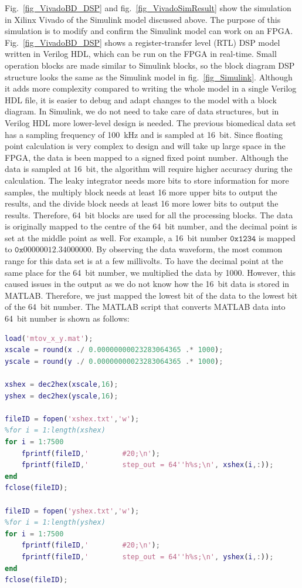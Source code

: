 Fig.~\ref{fig_VivadoBD_DSP} and fig.~\ref{fig_VivadoSimResult} show the simulation in Xilinx Vivado of the Simulink model discussed above.  The purpose of this simulation is to modify and confirm the Simulink model can work on an FPGA.  Fig.~\ref{fig_VivadoBD_DSP} shows a register-transfer level (RTL) DSP model written in Verilog HDL, which can be run on the FPGA in real-time.  Small operation blocks are made similar to Simulink blocks, so the block diagram DSP structure looks the same as the Simulink model in fig.~\ref{fig_Simulink}.  Although it adds more complexity compared to writing the whole model in a single Verilog HDL file, it is easier to debug and adapt changes to the model with a block diagram.  In Simulink, we do not need to take care of data structures, but in Verilog HDL more lower-level design is needed.  The previous biomedical data set has a sampling frequency of \qty{100}{kHz} and is sampled at \qty{16}{bit}.  Since floating point calculation is very complex to design and will take up large space in the FPGA, the data is been mapped to a signed fixed point number.   Although the data is sampled at \qty{16}{bit}, the algorithm will require higher accuracy during the calculation.  The leaky integrator needs more bits to store information for more samples, the multiply block needs at least 16 more upper bits to output the results, and the divide block needs at least 16 more lower bits to output the results.  Therefore, \qty{64}{bit} blocks are used for all the processing blocks.  The data is originally mapped to the centre of the \qty{64}{bit} number, and the decimal point is set at the middle point as well.  For example, a \qty{16}{bit} number $\mathtt{0x1234}$ is mapped to $\mathtt{0x00000012.34000000}$.  By observing the data waveform, the most common range for this data set is at a few millivolts.  To have the decimal point at the same place for the \qty{64}{bit} number, we multiplied the data by 1000.  However, this caused issues in the output as we do not know how the \qty{16}{bit} data is stored in MATLAB.  Therefore, we just mapped the lowest bit of the data to the lowest bit of the \qty{64}{bit} number.  The MATLAB script that converts MATLAB data into \qty{64}{bit} number is shown as follows:

\begin{lstlisting}[language=matlab]
load('mtov_x_y.mat');
xscale = round(x ./ 0.00000000023283064365 .* 1000);
yscale = round(y ./ 0.00000000023283064365 .* 1000);

xshex = dec2hex(xscale,16);
yshex = dec2hex(yscale,16);

fileID = fopen('xshex.txt','w');
%for i = 1:length(xshex)
for i = 1:7500
    fprintf(fileID,'        #20;\n');
    fprintf(fileID,'        step_out = 64''h%s;\n', xshex(i,:));
end
fclose(fileID);

fileID = fopen('yshex.txt','w');
%for i = 1:length(yshex)
for i = 1:7500
    fprintf(fileID,'        #20;\n');
    fprintf(fileID,'        step_out = 64''h%s;\n', yshex(i,:));
end
fclose(fileID);
\end{lstlisting}

